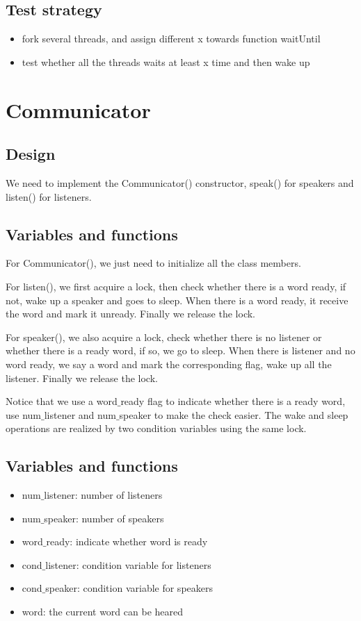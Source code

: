 \documentclass[a4paper,10pt]{article}
\begin{document}
\subsection {Test strategy}
\begin{itemize}
\item fork several threads, and assign different x towards function waitUntil
\item test whether all the threads waits at least x time and then wake up
\end{itemize}
\section{Communicator}
\subsection{Design}

We need to implement the Communicator() constructor, speak() for speakers and listen() for listeners.
\subsection{Variables and functions}
For Communicator(), we just need to initialize all the class members.

For listen(), we first acquire a lock, then check whether there is a word ready, if not, wake up a speaker and goes to sleep. When there is a word ready, it receive the word and mark it unready. Finally we release the lock.

For speaker(), we also acquire a lock, check whether there is no listener or whether there is a ready word, if so, we go to sleep. When there is listener and no word ready, we say a word and mark the corresponding flag, wake up all the listener. Finally we release the lock.

Notice that we use a word$\_$ready flag to indicate whether there is a ready word, use num$\_$listener and num$\_$speaker to make the check easier. The wake and sleep operations are realized by two condition variables using the same lock.
\subsection {Variables and functions}
\begin{itemize}
\item num$\_$listener: number of listeners
\item num$\_$speaker: number of speakers
\item word$\_$ready: indicate whether word is ready
\item cond$\_$listener: condition variable for listeners
\item cond$\_$speaker: condition variable for speakers
\item word: the current word can be heared
\end{itemize}
\end{document}
